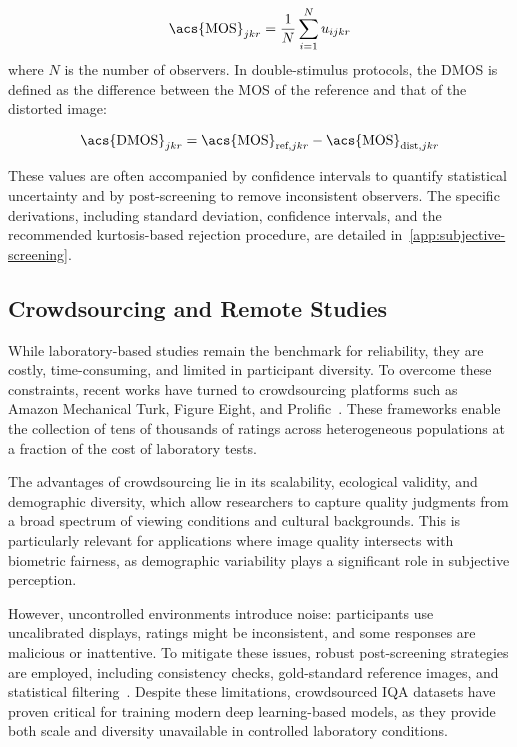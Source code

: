 \begin{equation}
\text{\acs{MOS}}_{jkr} = \frac{1}{N} \sum_{i=1}^{N} u_{ijkr}
\end{equation}
where $N$ is the number of observers. In double-stimulus protocols, the \acs{DMOS} is defined as the difference between the \acs{MOS} of the reference and that of the distorted image:

\begin{equation}
\text{\acs{DMOS}}_{jkr} = \text{\acs{MOS}}_{\text{ref},jkr} - \text{\acs{MOS}}_{\text{dist},jkr}
\end{equation}

These values are often accompanied by confidence intervals to quantify statistical uncertainty and by post-screening to remove inconsistent observers. The specific derivations, including standard deviation, confidence intervals, and the recommended kurtosis-based rejection procedure, are detailed in~\autoref{app:subjective-screening}.

\subsection{Crowdsourcing and Remote Studies}\label{sec:crowdsourcing}

While laboratory-based studies remain the benchmark for reliability, they are costly, time-consuming, and limited in participant diversity. To overcome these constraints, recent works have turned to crowdsourcing platforms such as Amazon Mechanical Turk, Figure Eight, and Prolific~\cite{ghadiyaram2015massive, kadid10k}. These frameworks enable the collection of tens of thousands of ratings across heterogeneous populations at a fraction of the cost of laboratory tests.

The advantages of crowdsourcing lie in its scalability, ecological validity, and demographic diversity, which allow researchers to capture quality judgments from a broad spectrum of viewing conditions and cultural backgrounds. This is particularly relevant for applications where image quality intersects with biometric fairness, as demographic variability plays a significant role in subjective perception.

However, uncontrolled environments introduce noise: participants use uncalibrated displays, ratings might be inconsistent, and some responses are malicious or inattentive. To mitigate these issues, robust post-screening strategies are employed, including consistency checks, gold-standard reference images, and statistical filtering~\cite{ghadiyaram2015massive, koniq10k}. Despite these limitations, crowdsourced \acs{IQA} datasets have proven critical for training modern deep learning-based models, as they provide both scale and diversity unavailable in controlled laboratory conditions.

